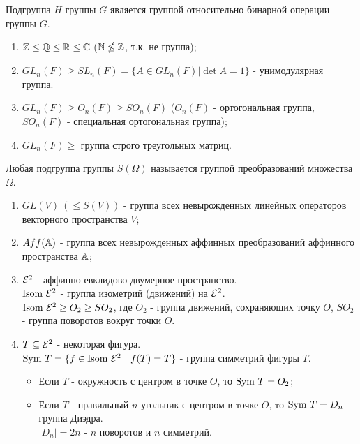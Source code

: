 \begin{subtheorem}
    Подгруппа $H$ группы $G$ является группой относительно бинарной операции группы $G$.
\end{subtheorem}
\begin{examples} \tab
    \begin{enumerate}
        \item $\mathbb{Z} \leq \mathbb{Q} \leq \mathbb{R} \leq \mathbb{C}$ ($\mathbb{N} \nleq \mathbb{Z}$, т.к. не группа);
        \item $GL_n(F) \geq SL_n(F) = \{A \in GL_n(F)| \det A = 1\}$ - унимодулярная группа.
        \item $GL_n(F) \geq O_n(F) \geq SO_n(F)$ ($O_n(F)$ - ортогональная группа, $SO_n(F)$ - специальная ортогональная группа);
        \item $GL_n(F) \geq$ группа строго треугольных матриц.
    \end{enumerate}
\end{examples}
\begin{definition}
    Любая подгруппа группы $S(\Omega)$ называется группой преобразований множества $\Omega$.
\end{definition}
\begin{examples} \tab
    \begin{enumerate}
        \item $GL(V) \ (\leq S(V))$ - группа всех невырожденных линейных операторов векторного пространства $V$;
        \item $Aff(\mathbb{A})$ - группа всех невырожденных аффинных преобразований аффинного пространства $\mathbb{A}$;
        \item $\mathcal{E}^2$ - аффинно-евклидово двумерное пространство.\\
        $\textup{Isom} \ \mathcal{E}^2$ - группа изометрий (движений) на $\mathcal{E}^2$.\\
        $\textup{Isom} \ \mathcal{E}^2 \geq O_2 \geq SO_2$, где $O_2$ - группа движений, сохраняющих точку $O$, $SO_2$ - группа поворотов вокруг точки $O$.
        \item $T \subseteq \mathcal{E}^2$ - некоторая фигура.\\
        $\textup{Sym}\ T = \{f \in \textup{Isom} \ \E^2 \ | \ f(T) = T\}$ - группа симметрий фигуры $T$.
        \begin{itemize}
            \item Если $T$ - окружность с центром в точке $O$, то $\textup{Sym}\ T = O_2$;
            \item Если $T$ - правильный $n$-угольник с центром в точке $O$, то $\textup{Sym}\ T = D_n$ - группа Диэдра.\\
            $|D_n| = 2n$ - $n$ поворотов и $n$ симметрий. 
        \end{itemize}
    \end{enumerate}
\end{examples}
